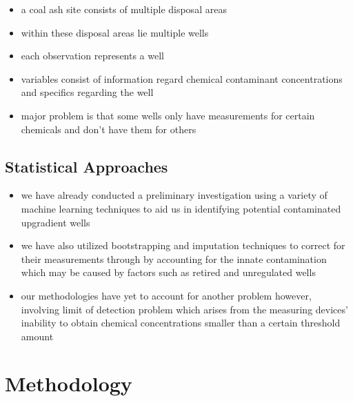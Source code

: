 \documentclass[12pt, twoside]{amherstthesis}
\begin{document}
\begin{itemize}
\item
  a coal ash site consists of multiple disposal areas
\item
  within these disposal areas lie multiple wells
\item
  each observation represents a well
\item
  variables consist of information regard chemical contaminant concentrations and specifics regarding the well
\item
  major problem is that some wells only have measurements for certain chemicals and don't have them for others
\end{itemize}
\hypertarget{statistical-approaches}{%
\section{Statistical Approaches}\label{statistical-approaches}}
\begin{itemize}
\item
  we have already conducted a preliminary investigation using a variety of machine learning techniques to aid us in identifying potential contaminated upgradient wells
\item
  we have also utilized bootstrapping and imputation techniques to correct for their measurements through by accounting for the innate contamination which may be caused by factors such as retired and unregulated wells
\item
  our methodologies have yet to account for another problem however, involving limit of detection problem which arises from the measuring devices' inability to obtain chemical concentrations smaller than a certain threshold amount
\end{itemize}
\hypertarget{methodology}{%
\chapter{Methodology}\label{methodology}}
\end{document}
